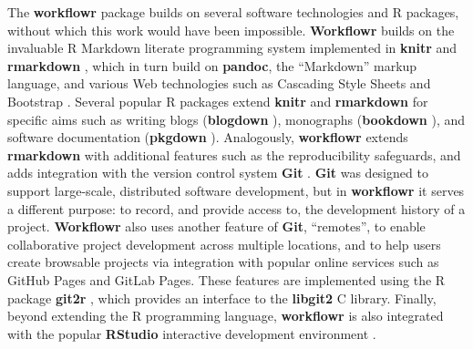 \documentclass[9pt,a4paper]{extarticle}
\begin{document}
The \textbf{workflowr} package builds on several software technologies and R
packages, without which this work would have been impossible. \textbf{Workflowr}
builds on the invaluable R Markdown literate programming system
implemented in \textbf{knitr} \cite{Xie2014, knitrpkg} and \textbf{rmarkdown}
\cite{Xie2018, rmarkdownpkg}, which in turn build on \textbf{pandoc}, the
``Markdown'' markup language, and various Web technologies such as
Cascading Style Sheets and Bootstrap \cite{Spurlock2013}. Several
popular R packages extend \textbf{knitr} and \textbf{rmarkdown} for specific aims such as
writing blogs  (\textbf{blogdown} \cite{blogdown}), monographs  (\textbf{bookdown}
\cite{bookdown}), and software documentation  (\textbf{pkgdown} \cite{pkgdown}).
Analogously, \textbf{workflowr} extends \textbf{rmarkdown} with additional features such
as the reproducibility safeguards, and adds integration with the version
control system \textbf{Git} \cite{Loeliger2012, Chacon2014}. \textbf{Git} was designed to
support large-scale, distributed software development, but in \textbf{workflowr}
it serves a different purpose: to record, and provide access to, the
development history of a project. \textbf{Workflowr} also uses another feature of
 \textbf{Git}, ``remotes'', to enable collaborative project development across
multiple locations, and to help users create browsable projects via
integration with popular online services such as GitHub Pages and GitLab
Pages. These features are implemented using the R package \textbf{git2r}
\cite{git2r}, which provides an interface to the \textbf{libgit2} C library.
Finally, beyond extending the R programming language, \textbf{workflowr} is also
integrated with the popular \textbf{RStudio} interactive development environment
\cite{rstudio}.
\end{document}
